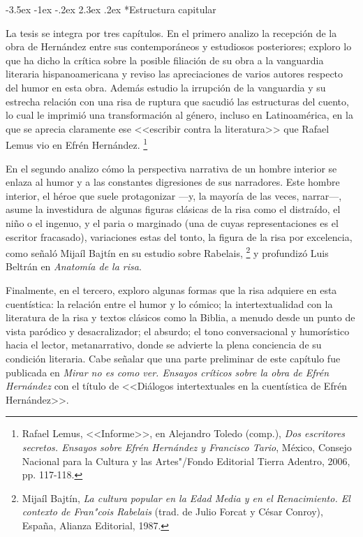 \documentclass[14pt,twoside,final]{extbook} %
\makeatletter
\let\oldfootnote\footnote
\renewcommand\footnote[1]{%
\oldfootnote{\hspace{1mm}#1}}
\renewcommand\section{\@startsection {section}{1}{\z@}%
                                     {-3.5ex \@plus -1ex \@minus -.2ex}%
                                     {2.3ex \@plus .2ex}%
                                     {\normalfont\large\bfseries\sc}}
\makeatother
\begin{document}
\section*{Estructura capitular}\label{sec:estructura-capitular}
La tesis se integra por tres capítulos. En el primero analizo la recepción de la obra de Hernández entre sus contemporáneos y estudiosos posteriores; exploro lo que ha dicho la crítica sobre la posible filiación de su obra a la vanguardia literaria hispanoamericana y reviso las apreciaciones de varios autores respecto del humor en esta obra. Además estudio la irrupción de la vanguardia y su estrecha relación con una risa de ruptura que sacudió las estructuras del cuento, lo cual le imprimió una transformación al género, incluso en Latinoamérica, en la que se aprecia claramente ese <<escribir contra la literatura>> que Rafael Lemus vio en Efrén Hernández.\footnote{Rafael Lemus, <<Informe>>, en Alejandro Toledo (comp.), \emph{Dos escritores secretos. Ensayos sobre Efrén Hernández y Francisco Tario}, México, Consejo Nacional para la Cultura y las Artes"/Fondo Editorial Tierra Adentro, 2006, pp. 117-118.}

En el segundo analizo cómo la perspectiva narrativa de un hombre interior se enlaza al humor y a las constantes digresiones de sus narradores. Este hombre interior, el héroe que suele protagonizar ---y, la mayoría de las veces, narrar---, asume la investidura de algunas figuras clásicas de la risa como el distraído, el niño o el ingenuo, y el paria o marginado (una de cuyas representaciones es el escritor fracasado), variaciones estas del tonto, la figura de la risa por excelencia, como
señaló Mijaíl Bajtín en su estudio sobre Rabelais,\footnote{Mijaíl Bajtín, \emph{La cultura popular en la Edad Media y en el Renacimiento. El contexto de Fran"cois Rabelais} (trad. de Julio Forcat y César Conroy), España, Alianza Editorial, 1987.} y profundizó Luis Beltrán en \emph{Anatomía de la risa}.

Finalmente, en el tercero, exploro algunas formas que la risa adquiere en esta cuentística: la relación entre el humor y lo cómico; la intertextualidad con la literatura de la risa y textos clásicos como la Biblia, a menudo desde un punto de vista paródico y desacralizador; el absurdo; el tono conversacional y humorístico hacia el lector, metanarrativo, donde se advierte la plena conciencia de su condición literaria. Cabe señalar que una parte preliminar de este capítulo fue publicada en \emph{Mirar no es como ver. Ensayos críticos sobre la obra de Efrén Hernández} con el título de <<Diálogos intertextuales en la cuentística de Efrén Hernández>>.
\end{document}

